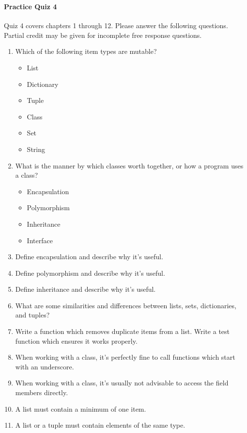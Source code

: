 \documentclass[letter,10pt]{article}
\begin{document}
\huge
\textbf{Practice Quiz 4}
\normalsize

\paragraph{}Quiz 4 covers chapters 1 through 12. Please answer the following questions. Partial credit may be given for incomplete free response questions.

\begin{enumerate}
    \item Which of the following item types are mutable?
    \begin{itemize}
        \item List
        \item Dictionary
        \item Tuple
        \item Class
        \item Set
        \item String
    \end{itemize}
    
    \item What is the manner by which classes worth together, or how a program uses a class?
    \begin{itemize}
    	\item Encapsulation
	\item Polymorphism
	\item Inheritance
	\item Interface
    \end{itemize}
    
    \item Define encapsulation and describe why it's useful.
    
    \item Define polymorphism and describe why it's useful.
    
    \item Define inheritance and describe why it's useful.
    
    \item What are some similarities and differences between lists, sets, dictionaries, and tuples?
    
    \item Write a function which removes duplicate items from a list. Write a test function which ensures it works properly.
    
    \item When working with a class, it's perfectly fine to call functions which start with an underscore.
    
    \item When working with a class, it's usually not advisable to access the field members directly.
    
    \item A list must contain a minimum of one item.
    
    \item A list or a tuple must contain elements of the same type.
    
\end{enumerate}
\end{document}

